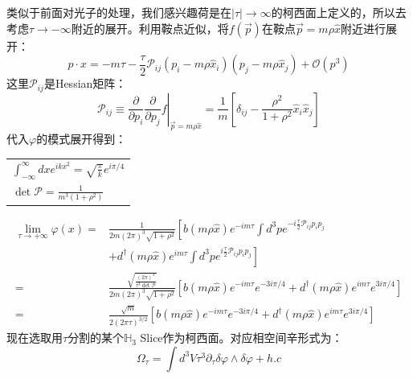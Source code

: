 类似于前面对光子的处理，我们感兴趣荷是在$|\tau|\to\infty$的柯西面上定义的，所以去考虑$\tau\to-\infty$附近的展开。利用鞍点近似，将$f(\vec{p})$在鞍点$\vec{p}=m\rho\hat x$附近进行展开：
\begin{equation}
	p\cdot x=-m\tau-\frac{\tau}{2}\mathcal{P}_{ij}(p_{i}-m\rho\hat{x}_{i})(p_{j}-m\rho\hat{x}_{j})+\mathcal{O}(p^{3})
\end{equation}
这里$\mathcal{P}_{ij}$是Hessian矩阵：
\begin{equation}
	\mathcal{P}_{ij}\equiv\left.\frac{\partial}{\partial p_i}\frac{\partial}{\partial p_j}f\right|_{\vec{p}=m\rho\hat{x}}=\frac{1}{m}\left[\delta_{ij}-\frac{\rho^2}{1+\rho^2}\hat{x}_i\hat{x}_j\right]
\end{equation}
代入$\varphi$的模式展开得到：\begin{margintable}\footnotesize 
	\begin{tabularx}{\marginparwidth}{|X}
		$\int_{-\infty}^{\infty}dxe^{ikx^2}=\sqrt{\frac{\pi}{k}}e^{i\pi/4}$\\
		$\det\mathcal{P}=\frac{1}{m^3(1+\rho^2)}$
	\end{tabularx}
\end{margintable}
\begin{equation}\label{26.14}
	\begin{aligned}
		\lim_{\tau\to+\infty}\varphi(x)=& \frac1{2m(2\pi)^3\sqrt{1+\rho^2}}\left[b(m\rho\hat{x})e^{-im\tau}\int d^3pe^{-i\frac\tau2{\mathcal P}_{ij}p_ip_j}\right.  \\
		&+d^{\dagger}(m\rho\hat{x})e^{im\tau}\left.\int d^{3}pe^{i\frac{\tau}{2}\mathcal{P}_{ij}p_{i}p_{j}}\right] \\
		=&\frac{\sqrt{\frac{(2\pi)^3}{\tau^3\det\mathcal{P}}}}{2m(2\pi)^3\sqrt{1+\rho^2}}\left[b(m\rho\hat{x})e^{-im\tau}e^{-3i\pi/4}+d^\dagger(m\rho\hat{x})e^{im\tau}e^{3i\pi/4}\right]\\
		=&\frac{\sqrt{m}}{2(2\pi\tau)^{3/2}}\left[b(m\rho\hat{x})e^{-im\tau}e^{-3i\pi/4}+d^\dagger(m\rho\hat{x})e^{im\tau}e^{3i\pi/4}\right]
	\end{aligned}
\end{equation}
现在选取用$\tau$分割的某个$\mathbb{H}_3$ Slice作为柯西面。对应相空间辛形式为：
\begin{equation}
	\Omega_{\tau}=\int d^{3}V\tau^{3}\partial_{\tau}\delta\varphi\wedge\delta\varphi+h.c
\end{equation}
